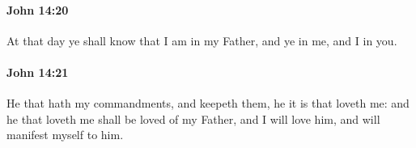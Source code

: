 		\paragraph{John 14:20} %
			\label{JOHN-14-20}

			At that day ye shall know that I am in my Father, and ye in me, and I in you.

			\begin{framed}
				\scriptsize
				\begin{compactdesc}
					\item[SBLG] 
				\end{compactdesc}
			\end{framed}

		\paragraph{John 14:21} %
			\label{JOHN-14-21}

			He that hath my commandments, and keepeth them, he it is that loveth me: and he that loveth me shall be loved of my Father, and I will love him, and will manifest myself to him.

